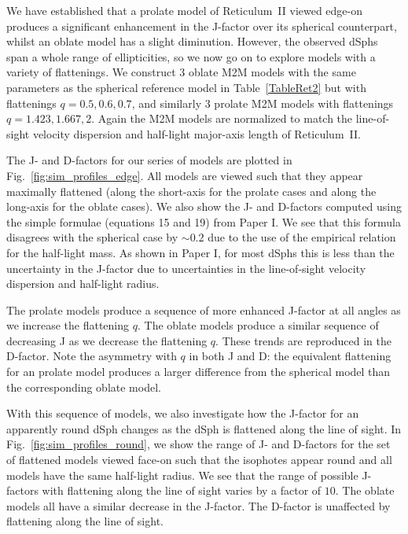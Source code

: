 \documentclass[prd,twocolumn,showpacs,preprintnumbers,superscriptaddress,nofootinbib,amsmath,amssymb,nobalancelastpage]{revtex4}
\begin{document}
We have established that a prolate model of Reticulum~II viewed
edge-on produces a significant enhancement in the J-factor over its
spherical counterpart, whilst an oblate model has a slight
diminution. However, the observed dSphs span a whole range of
ellipticities, so we now go on to explore models with a variety of
flattenings. We construct 3 oblate M2M models with the same parameters
as the spherical reference model in Table~\ref{TableRet2} but with
flattenings $q=0.5,0.6,0.7$, and similarly 3 prolate M2M models with
flattenings $q=1.423,1.667,2$. Again the M2M models are normalized to
match the line-of-sight velocity dispersion and half-light major-axis length of
Reticulum~II.

The J- and D-factors for our series of models are plotted in
Fig.~\ref{fig:sim_profiles_edge}. All models are viewed such that they
appear maximally flattened (along the short-axis for the prolate cases
and along the long-axis for the oblate cases). We also show the J- and
D-factors computed using the simple formulae (equations 15 and 19)
from Paper I. We see that this formula disagrees with the spherical
case by $\sim0.2$ due to the use of the empirical relation for the
half-light mass. As shown in Paper I, for most dSphs this is less than the uncertainty in the J-factor due to uncertainties in the line-of-sight velocity dispersion and half-light radius.

The prolate models produce a sequence of more enhanced J-factor at all
angles as we increase the flattening $q$. The oblate models produce a
similar sequence of decreasing J as we decrease the flattening
$q$. These trends are reproduced in the D-factor. Note the asymmetry
with $q$ in both J and D: the equivalent flattening for an prolate
model produces a larger difference from the spherical model than the corresponding oblate model.

With this sequence of models, we also investigate how the J-factor for
an apparently round dSph changes as the dSph is flattened along the
line of sight. In Fig.~\ref{fig:sim_profiles_round}, we show the range
of J- and D-factors for the set of flattened models viewed face-on
such that the isophotes appear round and all models have the same half-light radius. We see that the range of
possible J-factors with flattening along the line of sight varies by a
factor of $10$. The oblate models all have a similar decrease in the
J-factor. The D-factor is unaffected by flattening along the line of
sight.
\end{document}
